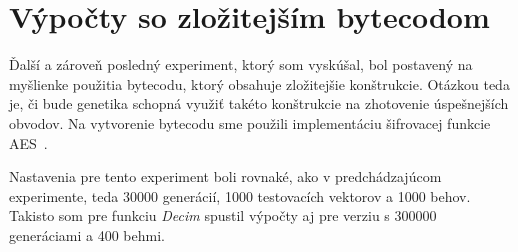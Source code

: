 \section{Výpočty so zložitejším bytecodom}
\label{sec:exp3}

Ďalší a zároveň posledný experiment, ktorý som vyskúšal, bol postavený na myšlienke použitia bytecodu, ktorý obsahuje zložitejšie konštrukcie. Otázkou teda je, či bude genetika schopná využiť takéto konštrukcie na zhotovenie úspešnejších obvodov. Na vytvorenie bytecodu sme použili implementáciu šifrovacej funkcie AES~\parencite{AES-FIPS}.

Nastavenia pre tento experiment boli rovnaké, ako v predchádzajúcom experimente, teda 30000 generácií, 1000 testovacích vektorov a 1000 behov. Takisto som pre funkciu \textit{Decim} spustil výpočty aj pre verziu s 300000 generáciami a 400 behmi. 
